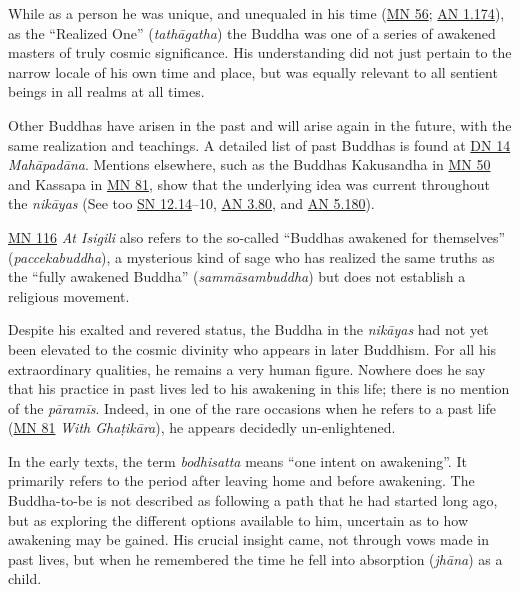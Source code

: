 \documentclass[12pt,openany]{book}%
\begin{document}
While as a person he was unique, and unequaled in his time (\href{https://suttacentral.net/mn56}{MN 56}; \href{https://suttacentral.net/an1.174}{AN 1.174}), as the “Realized One” (\textit{\textsanskrit{tathāgatha}}) the Buddha was one of a series of awakened masters of truly cosmic significance. His understanding did not just pertain to the narrow locale of his own time and place, but was equally relevant to all sentient beings in all realms at all times.

Other Buddhas have arisen in the past and will arise again in the future, with the same realization and teachings. A detailed list of past Buddhas is found at \href{https://suttacentral.net/dn14}{DN 14} \textit{\textsanskrit{Mahāpadāna}}. Mentions elsewhere, such as the Buddhas Kakusandha in \href{https://suttacentral.net/mn50}{MN 50} and Kassapa in \href{https://suttacentral.net/mn81}{MN 81}, show that the underlying idea was current throughout the \textit{\textsanskrit{nikāyas}} (See too \href{https://suttacentral.net/sn12.14}{SN 12.14}–10, \href{https://suttacentral.net/an3.80}{AN 3.80}, and \href{https://suttacentral.net/an5.180}{AN 5.180}).

\href{https://suttacentral.net/mn116}{MN 116} \textit{At Isigili} also refers to the so-called “Buddhas awakened for themselves” (\textit{paccekabuddha}), a mysterious kind of sage who has realized the same truths as the “fully awakened Buddha” (\textit{\textsanskrit{sammāsambuddha}}) but does not establish a religious movement.

Despite his exalted and revered status, the Buddha in the \textit{\textsanskrit{nikāyas}} had not yet been elevated to the cosmic divinity who appears in later Buddhism. For all his extraordinary qualities, he remains a very human figure. Nowhere does he say that his practice in past lives led to his awakening in this life; there is no mention of the \textit{\textsanskrit{pāramīs}}. Indeed, in one of the rare occasions when he refers to a past life (\href{https://suttacentral.net/mn81}{MN 81} \textit{With \textsanskrit{Ghaṭikāra}}), he appears decidedly un-enlightened.

In the early texts, the term \textit{bodhisatta} means “one intent on awakening”. It primarily refers to the period after leaving home and before awakening. The Buddha-to-be is not described as following a path that he had started long ago, but as exploring the different options available to him, uncertain as to how awakening may be gained. His crucial insight came, not through vows made in past lives, but when he remembered the time he fell into absorption (\textit{\textsanskrit{jhāna}}) as a child.
\end{document}
